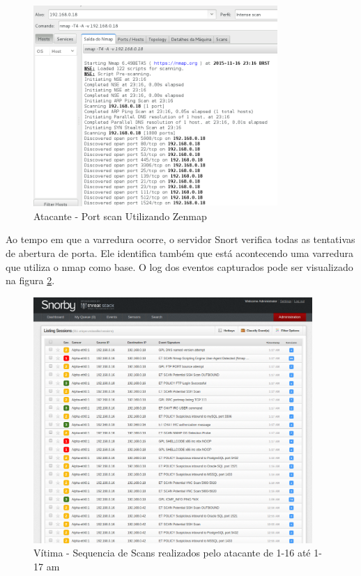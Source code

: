 	 \begin{figure}[h]
 	 \centering
 	 \includegraphics[width=350px, scale=1]{resource/atacante_port_scan}
 	 \caption{Atacante - Port scan Utilizando Zenmap}
  \label{fig:atacante_port_scan}
  \end{figure}

	Ao tempo em que a varredura ocorre, o servidor Snort verifica todas as tentativas
	de abertura de porta. Ele identifica também que está acontecendo uma varredura
	que utiliza o nmap como base. O log dos eventos capturados pode ser visualizado na
	figura \ref{fig:vitima_log_port_scan}.

	 \begin{figure}[h]
 	 \centering
 	 \includegraphics[width=400px, scale=1]{resource/vitima_log_port_scan}
 	 \caption{Vítima - Sequencia de Scans realizados pelo atacante de 1-16 até 1-17 am}
  \label{fig:vitima_log_port_scan}
  \end{figure}

